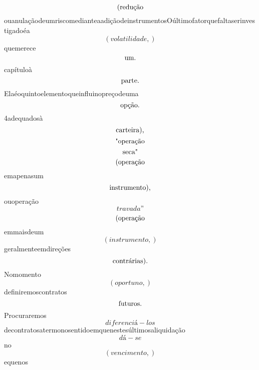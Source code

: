 \documentclass{article}
\begin{document}
\begin{equation}
$(redução$
\end{equation}ouanulaçãodeumriscomedianteaadiçãodeinstrumentosOúltimofatorquefaltaserinvestigadoéa\begin{equation}
\left( volatilidade,\right)
\end{equation}quemerece\begin{equation}
$um.$
\end{equation}capítuloà\begin{equation}
$parte.$
\end{equation}Elaéoquintoelementoqueinfluinopreçodeuma\begin{equation}
$opção.$
\end{equation}4adequadosà\begin{equation}
$carteira),$
\end{equation}\begin{equation}
$"operação$
\end{equation}\begin{equation}
$seca"$
\end{equation}\begin{equation}
$(operação$
\end{equation}emapenasum\begin{equation}
$instrumento),$
\end{equation}ouoperação\begin{equation}
travada”
\end{equation}\begin{equation}
$(operação$
\end{equation}emmaisdeum\begin{equation}
\left( instrumento,\right)
\end{equation}geralmenteemdireções\begin{equation}
$contrárias).$
\end{equation}Nomomento\begin{equation}
\left( oportuno,\right)
\end{equation}definiremoscontratos\begin{equation}
$futuros.$
\end{equation}Procuraremos\begin{equation}
diferenciá - los
\end{equation}decontratosatermonosentidoemquenestesúltimosaliquidação\begin{equation}
dá - se
\end{equation}no\begin{equation}
\left( vencimento,\right)
\end{equation}equenos\begin{equation}

\end{equation}
\end{document}
